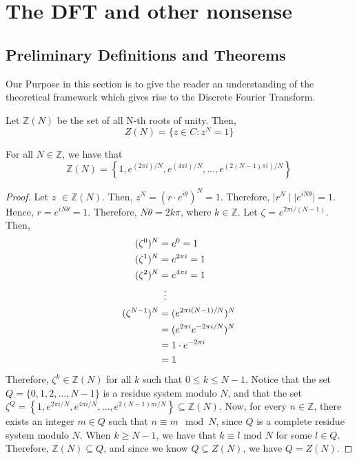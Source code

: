 \documentclass[../article.tex]{subfiles}
\begin{document}
\section{The DFT and other nonsense}

\subsection{Preliminary Definitions and Theorems}
	Our Purpose in this section is to give the reader an understanding of the theoretical framework which gives rise to the Discrete Fourier Transform.

\begin{definition}
Let $\mathbb{Z}(N)$ be the set of all N-th roots of unity. Then,
 \[Z(N) = \{z \in C : z^N = 1 \}\]
\end{definition}
\begin{theorem}
For all $N \in \mathbb{Z}$, we have that
\[\mathbb{Z}(N)= \left\{1, e^{(2 \pi i)/N}, e^{(4 \pi i)/N}, \ldots, e^{(2(N-1) \pi i)/N}\right\}\]
\end{theorem}

\begin{proof}
Let $z$ $\in \mathbb{Z}(N)$. Then, $z^N = (r \cdot e^{i \theta})^N = 1$. Therefore, $\mid r^N \mid \mid e^{i N \theta} \mid = 1$. Hence, $r = e^{i N \theta} = 1$. Therefore, $N\theta = 2k\pi$, where $k \in \mathbb{Z}$. Let $\zeta$ = $e^{2 \pi i /(N-1)}$. Then,
\begin{align*}
	(\zeta^0)^N &= e^0 = 1 \\
	(\zeta^1)^N &= e^{2 \pi i} = 1 \\
	(\zeta^2)^N &= e^{4 \pi i} = 1 \\
	{} &\vdotswithin{=}\\
	(\zeta^{N-1})^N &= (e^{2 \pi i(N-1)/N})^N \\
	{} &= (e^{2 \pi i}e^{-2 \pi i/N})^N \\
	{} &= 1 \cdot e^{-2 \pi i} \\
	{} &= 1
\end{align*}
Therefore, $\zeta^k \in \mathbb{Z}(N)$ for all $k$ such that $0 \leq k \leq N-1$. Notice that the set $Q = \{0, 1, 2, \ldots, N-1\}$ is a residue system modulo $N$, and that the set $\zeta^Q = \left\{1, e^{2 \pi i/N}, e^{4 \pi i/N}, \ldots, e^{2(N-1) \pi i/N}\right\} \subseteq \mathbb{Z}(N) $.
Now, for every $n \in \mathbb{Z}$, there exists an integer $m \in Q$ such that $n \equiv m \mod N$, since $Q$ is a complete residue system modulo $N$. When $k \geq N-1$, we have that $k \equiv l$ mod $N$ for some $l \in Q$. Therefore, $\mathbb{Z}(N) \subseteq Q$, and since we know $Q \subseteq Z(N)$, we have $Q = Z(N)$.
\end{proof}
\end{document}
